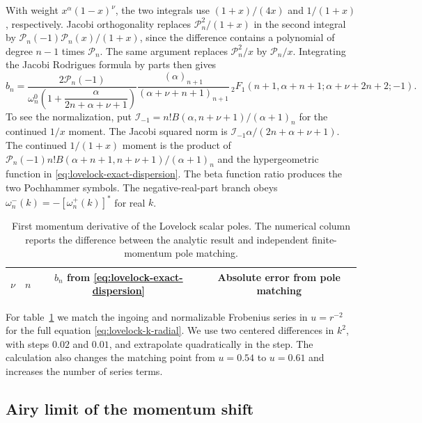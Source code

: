 With weight \(x^\alpha(1-x)^\nu\), the two integrals use
\((1+x)/(4x)\) and \(1/(1+x)\), respectively. Jacobi orthogonality
replaces \(\mathcal P_n^2/(1+x)\) in the second integral by
\(\mathcal P_n(-1)\mathcal P_n(x)/(1+x)\), since the difference
contains a polynomial of degree \(n-1\) times \(\mathcal P_n\).
The same argument replaces \(\mathcal P_n^2/x\) by
\(\mathcal P_n/x\). Integrating the Jacobi Rodrigues formula \cite{NIST:DLMF}
by parts then gives
\begin{equation}
 b_n=
 \frac{2\mathcal P_n(-1)}
 {\omega_n^0\left(1+\dfrac{\alpha}{2n+\alpha+\nu+1}\right)}
 \frac{(\alpha)_{n+1}}{(\alpha+\nu+n+1)_{n+1}}\,
 {}_2F_1(n+1,\alpha+n+1;\alpha+\nu+2n+2;-1).
 \label{eq:lovelock-exact-dispersion}
\end{equation}
To see the normalization, put
\(\mathcal I_{-1}=n!B(\alpha,n+\nu+1)/(\alpha+1)_n\) for the
continued \(1/x\) moment. The Jacobi squared norm is
\(\mathcal I_{-1}\alpha/(2n+\alpha+\nu+1)\).
The continued \(1/(1+x)\) moment is the product of
\(\mathcal P_n(-1)n!B(\alpha+n+1,n+\nu+1)/(\alpha+1)_n\)
and the hypergeometric function in \eqref{eq:lovelock-exact-dispersion}.
The beta function ratio produces the two Pochhammer symbols.
The negative-real-part branch obeys
\(\omega_n^-(k)=-[\omega_n^+(k)]^*\) for real \(k\).

\begin{table}[t]
 \centering\small
 \begin{tabular}{cccc}
 \hline
 \(\nu\) & \(n\) & \(b_n\) from \eqref{eq:lovelock-exact-dispersion}
     & Absolute error from pole matching \\
 \hline
 
 \end{tabular}
 \caption{First momentum derivative of the Lovelock scalar poles.
 The numerical column reports the difference between the analytic
 result and independent finite-momentum pole matching.}
 \label{tab:lovelock-momentum}
\end{table}

For table~\ref{tab:lovelock-momentum} we match the ingoing and
normalizable Frobenius series in \(u=r^{-2}\) for the full
equation \eqref{eq:lovelock-k-radial}. We use two centered
differences in \(k^2\), with steps \(0.02\) and \(0.01\), and
extrapolate quadratically in the step. The calculation also
changes the matching point from \(u=0.54\) to \(u=0.61\) and
increases the number of series terms.

\subsection{Airy limit of the momentum shift}
\label{sec:lovelock-airy}

